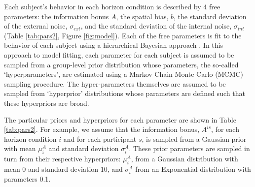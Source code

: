 \documentclass[12pt]{article}
\begin{document}
	Each subject's behavior in each horizon condition is described by 4 free parameters: the information bonus $A$, the spatial bias, $b$, the standard deviation of the external noise, $\sigma_{ext}$, and the standard deviation of the internal noise, $\sigma_{int}$ (Table \ref{tab:pars2}, Figure \ref{fig:model}). Each of the free parameters is fit to the behavior of each subject using a hierarchical Bayesian approach \citep{hbm1}.  In this approach to model fitting, each parameter for each subject is assumed to be sampled from a group-level prior distribution whose parameters, the so-called `hyperparameters', are estimated using a Markov Chain Monte Carlo (MCMC) sampling procedure. The hyper-parameters themselves are assumed to be sampled from `hyperprior' distributions whose parameters are defined such that these hyperpriors are broad.  
	
	The particular priors and hyperpriors for each parameter are shown in Table \ref{tab:pars2}. For example, we assume that the information bonus, $A^{is}$, for each horizon condition $i$ and for each participant $s$, is sampled from a Gaussian prior with mean $\mu^{A}_{i}$ and standard deviation $\sigma_{i}^A$. These prior parameters are sampled in turn from their respective hyperpriors: $\mu_{i}^{A}$, from a Gaussian distribution with mean 0 and standard deviation 10, and $\sigma_{i}^A$ from an Exponential distribution with parameters 0.1.
	
\end{document}
